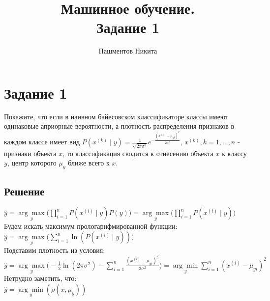 \documentclass[11pt]{article}
\title{\textbf{Машинное обучение.\\ Задание 1}}
\author{Пашментов Никита}
\date{}
\begin{document}
\maketitle

\section{Задание 1}
Покажите, что если в наивном байесовском классификаторе классы имеют одинаковые априорные вероятности, а плотность распределения признаков в каждом классе имеет вид $P(x^{(k)} \mid y) = \frac{1}{\sqrt{2\pi\sigma^{2}}}e^{-\frac{(x^{(k)} - \mu_{yk})^{2}}{2\sigma^{2}}}$, $x^{(k)}, k = 1, \dots, n$ - признаки объекта $x$, то классификация сводится к отнесению объекта $x$ к классу $y$, центр которого $\mu_{y}$ ближе всего к $x$.\\

\subsection{Решение}
$\hat{y} = \underset{y}{\arg\max}{\big(\prod\limits_{i = 1}^{n}{P(x^{(i)} \mid y)P(y)}}\big) = \underset{y}{\arg\max}{\big(\prod\limits_{i = 1}^{n}{P(x^{(i)} \mid y)}}\big)$\\
Будем искать максимум прологарифмированной функции:\\
$\hat{y} = \underset{y}{\arg\max}{\big(\sum\limits_{i = 1}^{n}{\ln{(P(x^{(i)} \mid y))}}}\big)$\\
Подставим плотность из условия:\\
$\hat{y} = \underset{y}{\arg\max}{\big(-\frac{1}{2} \ln{(2\pi\sigma^{2}) - \sum\limits_{i = 1}^{n}{\frac{(x^{(i)} - \mu_{yi})^{2}}{2\sigma^{2}}}} \big)} = \underset{y}{\arg\min}{\sum\limits_{i = 1}^{n}{(x^{(i)} - \mu_{yi}) ^ {2}}}$\\
Нетрудно заметить, что:\\
$\hat{y} = \underset{y}{\arg\min}{(\rho(x, \mu_y))}$
\end{document}
